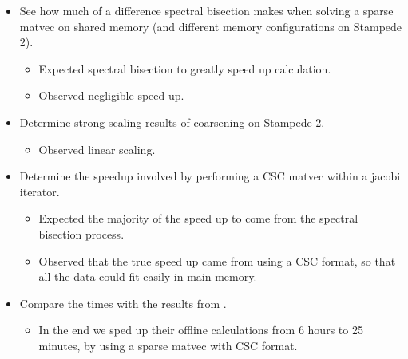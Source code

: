 \documentclass[11pt]{article}
\begin{document}
\begin{itemize}
	\item See how much of a difference spectral bisection makes when solving
		a sparse matvec on shared memory (and different memory
		configurations on Stampede 2). 
		\begin{itemize}
			\item Expected spectral bisection to greatly speed up
				calculation. 
			\item Observed negligible speed up.
		\end{itemize}
	
	\item Determine strong scaling results of coarsening on Stampede 2. 
		\begin{itemize}
			\item Observed linear scaling. 
		\end{itemize}
	\item Determine the speedup involved by performing a CSC matvec within a
		jacobi iterator. 
		\begin{itemize}
			\item Expected the majority of the speed up to come from
				the spectral bisection process. 
			\item Observed that the true speed up came from using a
				CSC format, so that all the data could fit
				easily in main memory. 
		\end{itemize}
	\item Compare the times with the results from \cite{xie}.
		\begin{itemize}
			\item In the end we sped up their offline calculations
				from 6 hours to 25 minutes, by using a sparse
				matvec with CSC format. 
		\end{itemize}
\end{itemize}





\newpage



 

\end{document}
